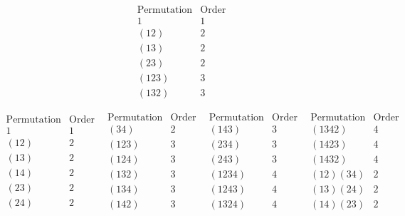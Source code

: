 \begin{solenum}
    \item
    $$\begin{array}{c|c}
        \text{Permutation} & \text{Order} \\
        \hline
        1 & 1 \\
        (12) & 2 \\
        (13) & 2 \\
        (23) & 2 \\
        (123) & 3 \\
        (132) & 3
    \end{array}$$
    \item 
    $$\begin{array}{c|c}
            \text{Permutation} & \text{Order} \\
            \hline
            1 & 1 \\
            (12) & 2 \\
            (13) & 2 \\
            (14) & 2 \\
            (23) & 2 \\
            (24) & 2
    \end{array}\enspace
    \begin{array}{c|c}
        \text{Permutation} & \text{Order} \\
        \hline
        (34) & 2 \\
        (123) & 3 \\
        (124) & 3 \\
        (132) & 3 \\
        (134) & 3 \\
        (142) & 3
    \end{array}\enspace
    \begin{array}{c|c}
        \text{Permutation} & \text{Order} \\
        \hline
        (143) & 3 \\
        (234) & 3 \\
        (243) & 3 \\
        (1234) & 4 \\
        (1243) & 4 \\
        (1324) & 4
    \end{array}\enspace
    \begin{array}{c|c}
        \text{Permutation} & \text{Order} \\
        \hline
        (1342) & 4 \\
        (1423) & 4 \\
        (1432) & 4 \\
        (12)(34) & 2 \\
        (13)(24) & 2 \\
        (14)(23) & 2
    \end{array}$$
\end{solenum}

